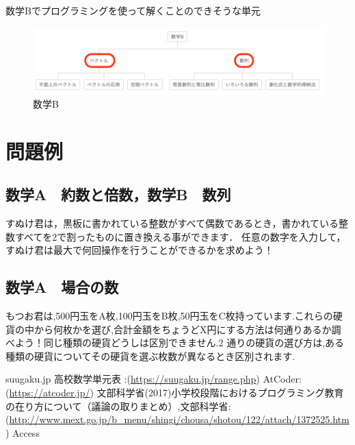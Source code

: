 \documentclass[dvipdfmx]{jsarticle}
\begin{document}
数学Bでプログラミングを使って解くことのできそうな単元
\begin{figure}[H]
  \centering
  \includegraphics[width=15cm]{B.png}
  \caption{数学B}
\end{figure}
\section{問題例}
\subsection{数学A　約数と倍数，数学B　数列}
すぬけ君は，黒板に書かれている整数がすべて偶数であるとき，書かれている整数すべてを2で割ったものに置き換える事ができます．
任意の数字を入力して，すぬけ君は最大で何回操作を行うことができるかを求めよう！\cite{atcoder}
\subsection{数学A　場合の数}
もつお君は,500円玉をA枚,100円玉をB枚,50円玉をC枚持っています.これらの硬貨の中から何枚かを選び,合計金額をちょうどX円にする方法は何通りあるか調べよう！同じ種類の硬貨どうしは区別できません.2 通りの硬貨の選び方は,ある種類の硬貨についてその硬貨を選ぶ枚数が異なるとき区別されます.\cite{atcoder}
\begin{thebibliography}{99}
 suugaku.jp 高校数学単元表 :(\url{https://suugaku.jp/range.php})
 AtCoder:(\url{https://atcoder.jp/})
 文部科学省(2017)小学校段階におけるプログラミング教育の在り方について（議論の取りまとめ）,文部科学省:(\url{http://www.mext.go.jp/b_menu/shingi/chousa/shotou/122/attach/1372525.htm})
Access
\end{thebibliography}
\end{document}
